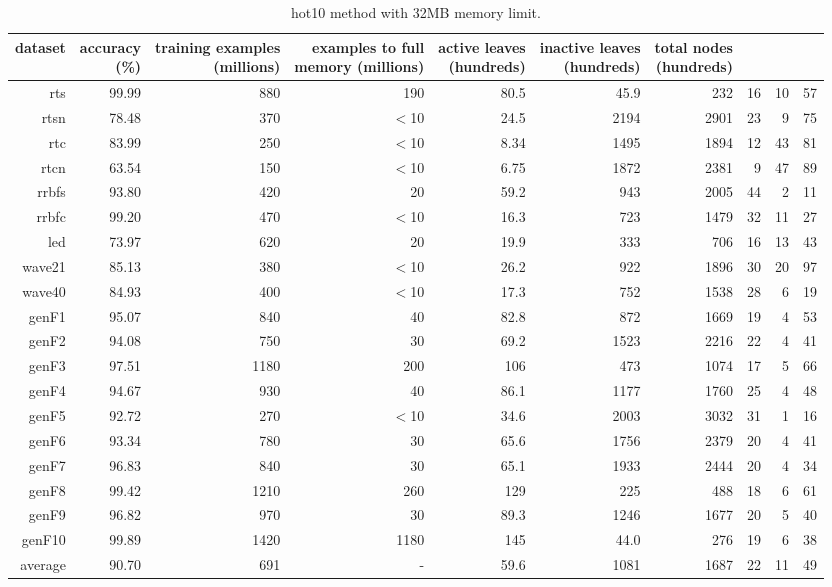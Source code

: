 \clearpage
\begin{table}
\caption{{\sc hot10} method with 32MB memory limit.}
\label{tab:hot10-32MB}
\centering
\begin{tabular}{|r|r|r|r|r|r|r|r|r|r|}
\hline
dataset	&
\rotatebox{90}{\parbox{9em}{accuracy\\(\%)}} &
\rotatebox{90}{\parbox{9em}{training examples\\(millions)}} &
\rotatebox{90}{\parbox{9em}{examples to full\\memory (millions)}} &
\rotatebox{90}{\parbox{9em}{active leaves\\(hundreds)}} &
\rotatebox{90}{\parbox{9em}{inactive leaves\\(hundreds)}} &
\rotatebox{90}{\parbox{9em}{total nodes\\(hundreds)}} &
\rotatebox{90}{\parbox{9em}{tree depth}}	&
\rotatebox{90}{\parbox{9em}{training speed (\%)}} &
\rotatebox{90}{\parbox{9em}{prediction speed (\%)}} \\
\hline
{\sc rts} & 99.99 & 880 & 190 & 80.5 & 45.9 & 232 & 16 & 10 & 57 \\
{\sc rtsn} & 78.48 & 370 & $<$10 & 24.5 & 2194 & 2901 & 23 & 9 & 75 \\
{\sc rtc} & 83.99 & 250 & $<$10 & 8.34 & 1495 & 1894 & 12 & 43 & 81 \\
{\sc rtcn} & 63.54 & 150 & $<$10 & 6.75 & 1872 & 2381 & 9 & 47 & 89 \\
{\sc rrbfs} & 93.80 & 420 & 20 & 59.2 & 943 & 2005 & 44 & 2 & 11 \\
{\sc rrbfc} & 99.20 & 470 & $<$10 & 16.3 & 723 & 1479 & 32 & 11 & 27 \\
{\sc led} & 73.97 & 620 & 20 & 19.9 & 333 & 706 & 16 & 13 & 43 \\
{\sc wave21} & 85.13 & 380 & $<$10 & 26.2 & 922 & 1896 & 30 & 20 & 97 \\
{\sc wave40} & 84.93 & 400 & $<$10 & 17.3 & 752 & 1538 & 28 & 6 & 19 \\
{\sc genF1} & 95.07 & 840 & 40 & 82.8 & 872 & 1669 & 19 & 4 & 53 \\
{\sc genF2} & 94.08 & 750 & 30 & 69.2 & 1523 & 2216 & 22 & 4 & 41 \\
{\sc genF3} & 97.51 & 1180 & 200 & 106 & 473 & 1074 & 17 & 5 & 66 \\
{\sc genF4} & 94.67 & 930 & 40 & 86.1 & 1177 & 1760 & 25 & 4 & 48 \\
{\sc genF5} & 92.72 & 270 & $<$10 & 34.6 & 2003 & 3032 & 31 & 1 & 16 \\
{\sc genF6} & 93.34 & 780 & 30 & 65.6 & 1756 & 2379 & 20 & 4 & 41 \\
{\sc genF7} & 96.83 & 840 & 30 & 65.1 & 1933 & 2444 & 20 & 4 & 34 \\
{\sc genF8} & 99.42 & 1210 & 260 & 129 & 225 & 488 & 18 & 6 & 61 \\
{\sc genF9} & 96.82 & 970 & 30 & 89.3 & 1246 & 1677 & 20 & 5 & 40 \\
{\sc genF10} & 99.89 & 1420 & 1180 & 145 & 44.0 & 276 & 19 & 6 & 38 \\
\hline
average & 90.70 & 691 &  -  & 59.6 & 1081 & 1687 & 22 & 11 & 49 \\
\hline
\end{tabular}
\end{table}
